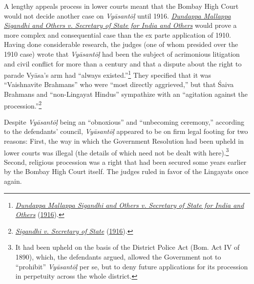 A lengthy appeals process in lower courts meant that the Bombay High Court would not decide another case on \emph{Vyāsantōḷ} until 1916. \hyperref[Dundappa]{\emph{Dundappa Mallappa Sigandhi and Others v. Secretary of State for India and Others}} would prove a more complex and consequential case than the ex parte application of 1910. Having done considerable research, the judges (one of whom presided over the 1910 case) wrote that \emph{Vyāsantōḷ} had been the subject of acrimonious litigation and civil conflict for more than a century and that a dispute about the right to parade Vyāsa’s arm had “always existed.”\footnote{%
\hyperref[Dundappa]{\emph{Dundappa Mallappa Sigandhi and Others v. Secretary of State for India and Others}} (\hyperref[Dundappa]{1916}).
}
 They specified that it was “Vaishnavite Brahmans” who were “most directly aggrieved,” but that Śaiva Brahmans and “non-Lingayat Hindus” sympathize with an “agitation against the procession.”\footnote{%
\hyperref[Dundappa]{\emph{Sigandhi v. Secretary of State}} (\hyperref[Dundappa]{1916}).
}



Despite \emph{Vyāsantōḷ} being an “obnoxious” and “unbecoming ceremony,” according to the defendants’ council, \emph{Vyāsantōḷ} appeared to be on firm legal footing for two reasons: First, the way in which the Government Resolution had been upheld in lower courts was illegal (the details of which need not be dealt with here).\footnote{%
It had been upheld on the basis of the District Police Act (Bom. Act IV of 1890), which, the defendants argued, allowed the Government not to “prohibit” \emph{Vyāsantōḷ} per se, but to deny future applications for its procession in perpetuity across the whole district. 
}
 Second, religious procession was a right that had been secured some years earlier by the Bombay High Court itself. The judges ruled in favor of the Lingayats once again. 


